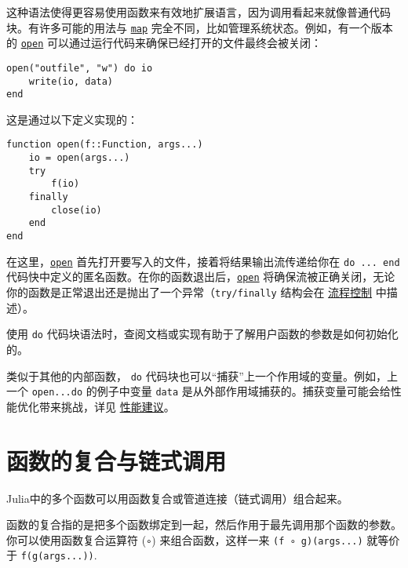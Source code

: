 这种语法使得更容易使用函数来有效地扩展语言，因为调用看起来就像普通代码块。有许多可能的用法与 \hyperlink{11483231213869150535}{\texttt{map}} 完全不同，比如管理系统状态。例如，有一个版本的 \hyperlink{300818094931158296}{\texttt{open}} 可以通过运行代码来确保已经打开的文件最终会被关闭：




\begin{verbatim}
open("outfile", "w") do io
    write(io, data)
end
\end{verbatim}



这是通过以下定义实现的：




\begin{verbatim}
function open(f::Function, args...)
    io = open(args...)
    try
        f(io)
    finally
        close(io)
    end
end
\end{verbatim}



在这里，\hyperlink{300818094931158296}{\texttt{open}} 首先打开要写入的文件，接着将结果输出流传递给你在 \texttt{do ... end} 代码快中定义的匿名函数。在你的函数退出后，\hyperlink{300818094931158296}{\texttt{open}} 将确保流被正确关闭，无论你的函数是正常退出还是抛出了一个异常（\texttt{try/finally} 结构会在 \hyperlink{6880586223574224557}{流程控制} 中描述）。



使用 \texttt{do} 代码块语法时，查阅文档或实现有助于了解用户函数的参数是如何初始化的。



类似于其他的内部函数， \texttt{do} 代码块也可以“捕获”上一个作用域的变量。例如，上一个 \texttt{open...do} 的例子中变量 \texttt{data} 是从外部作用域捕获的。捕获变量可能会给性能优化带来挑战，详见 \hyperlink{627547588659365489}{性能建议}。



\hypertarget{3483234324604369167}{}


\section{函数的复合与链式调用}



Julia中的多个函数可以用函数复合或管道连接（链式调用）组合起来。



函数的复合指的是把多个函数绑定到一起，然后作用于最先调用那个函数的参数。 你可以使用函数复合运算符 (\texttt{∘}) 来组合函数，这样一来 \texttt{(f ∘ g)(args...)} 就等价于 \texttt{f(g(args...))}.



